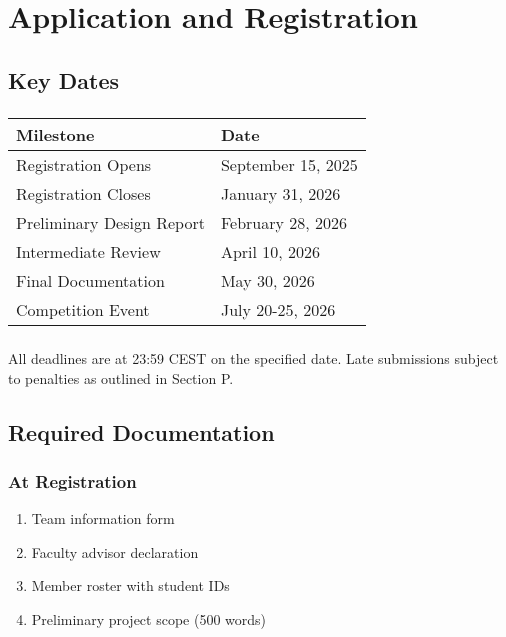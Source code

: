 
\renewcommand{\thesection}{AR}
\section{Application and Registration}

\subsection{Key Dates}

\subsubsection{}

\begin{tabular}{ll}
\toprule
Milestone & Date \\
\midrule
Registration Opens & September 15, 2025 \\
Registration Closes & January 31, 2026 \\
Preliminary Design Report & February 28, 2026 \\
Intermediate Review & April 10, 2026 \\
Final Documentation & May 30, 2026 \\
Competition Event & July 20-25, 2026 \\
\bottomrule
\end{tabular}

\subsubsection{}
All deadlines are at 23:59 CEST on the specified date. Late submissions subject to penalties as outlined in Section P.

\subsection{Required Documentation}

\subsubsection{At Registration}
\begin{enumerate}[noitemsep]
    \item Team information form
    \item Faculty advisor declaration
    \item Member roster with student IDs
    \item Preliminary project scope (500 words)
\end{enumerate}

